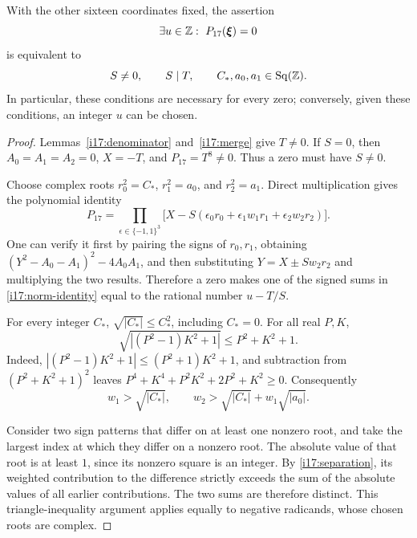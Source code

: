 \begin{lemma}
\label{i17:finalizer}
With the other sixteen coordinates fixed, the assertion
\[
 \exists u\in\Z:\ P_{17}(\boldsymbol\xi)=0
\]
is equivalent to
\begin{equation}
 S\ne0,\qquad S\mid T,\qquad
 C_\ast,a_0,a_1\in\operatorname{Sq}(\mathbb Z).
 \label{i17:finalizer-conditions}
\end{equation}
In particular, these conditions are necessary for every zero; conversely,
given these conditions, an integer $u$ can be chosen.
\end{lemma}
\begin{proof}
Lemmas~\ref{i17:denominator} and~\ref{i17:merge} give $T\ne0$.
If $S=0$, then $A_0=A_1=A_2=0$, $X=-T$, and
$P_{17}=T^8\ne0$. Thus a zero must have $S\ne0$.

Choose complex roots $r_0^2=C_\ast$, $r_1^2=a_0$, and $r_2^2=a_1$.
Direct multiplication gives the polynomial identity
\begin{equation}
 P_{17}=\prod_{\epsilon\in\{-1,1\}^3}
 \bigl[X-S(\epsilon_0r_0+\epsilon_1w_1r_1+\epsilon_2w_2r_2)\bigr].
 \label{i17:norm-identity}
\end{equation}
One can verify it first by pairing the signs of $r_0,r_1$, obtaining
$(Y^2-A_0-A_1)^2-4A_0A_1$, and then substituting
$Y=X\pm Sw_2r_2$ and multiplying the two results.
Therefore a zero makes one of the signed sums in
\eqref{i17:norm-identity} equal to the rational number $u-T/S$.

For every integer $C_\ast$,
$\sqrt{|C_\ast|}\le C_\ast^2$, including $C_\ast=0$.
For all real $P,K$,
\begin{equation}
 \sqrt{\left|(P^2-1)K^2+1\right|}\le P^2+K^2+1.
 \label{i17:root-bound}
\end{equation}
Indeed,
$|(P^2-1)K^2+1|\le(P^2+1)K^2+1$, and subtraction from
$(P^2+K^2+1)^2$ leaves
$P^4+K^4+P^2K^2+2P^2+K^2\ge0$.
Consequently
\begin{equation}
 w_1>\sqrt{|C_\ast|},\qquad
 w_2>\sqrt{|C_\ast|}+w_1\sqrt{|a_0|}.
 \label{i17:separation}
\end{equation}

Consider two sign patterns that differ on at least one nonzero root,
and take the largest index at which they differ on a nonzero root.
The absolute value of that root is at least $1$, since its nonzero
square is an integer. By \eqref{i17:separation}, its weighted
contribution to the difference strictly exceeds the sum of the absolute
values of all earlier contributions. The two sums are therefore
distinct. This triangle-inequality argument applies equally to negative
radicands, whose chosen roots are complex.


\end{proof}
